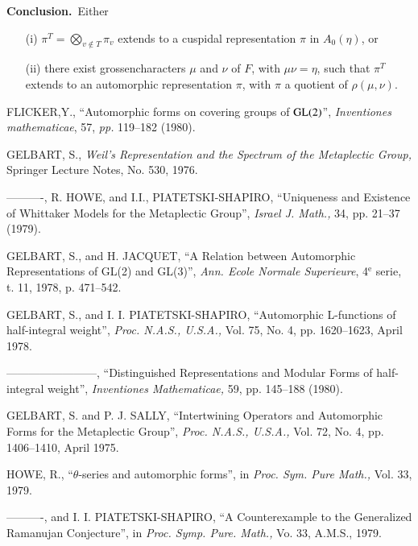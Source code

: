 \medskip
\noindent
{\bf Conclusion.}~Either
\begin{itemize}
\item[(i)] $\pi^{T}=\bigotimes\limits_{v\not\in T}\pi_{v}$ extends to a cuspidal representation $\pi$ in $A_{0}(\eta)$, or

\item[(ii)] there exist grossencharacters $\mu$ and $\nu$ of $F$, with $\mu\nu=\eta$, such that $\pi^{T}$ extends to an automorphic representation $\pi$, with $\pi$ a quotient of $\rho(\mu,\nu)$.
\end{itemize}

\begin{thebibliography}{99}
 FLICKER,\pageoriginale Y., ``Automorphic forms on covering groups of $\mathrm{GL}(2)$'', {\em Inventiones mathematicae}, 57, {\em pp.} 119--182 (1980).

 GELBART, S., {\em Weil's  Representation and the Spectrum of the Metaplectic Group,} Springer Lecture Notes, No. 530, 1976.

----------, R. HOWE, and I.I., PIATETSKI-SHAPIRO, ``Uniqueness and Existence of Whittaker Models for the Metaplectic Group'', {\em Israel J. Math.,} 34, pp. 21--37 (1979). 

 GELBART, S., and H. JACQUET, ``A Relation between Automorphic Representations of GL(2) and GL(3)'', {\em Ann. Ecole Normale Superieure}, 4$^{\text{e}}$ serie, t. 11, 1978, p. 471--542. 

 GELBART, S., and I. I. PIATETSKI-SHAPIRO, ``Automorphic L-functions of half-integral weight'', {\em Proc. N.A.S., U.S.A.,} Vol. 75, No. 4, pp. 1620--1623, April 1978. 

------------------------, ``Distinguished Representations and Modular Forms of half-integral weight'', {\em Inventiones Mathematicae,} 59, pp. 145--188 (1980).  

 GELBART, S. and P. J. SALLY, ``Intertwining Operators and Automorphic Forms for the Metaplectic Group'', {\em Proc. N.A.S., U.S.A.,} Vol. 72, No. 4, pp. 1406--1410, April 1975.  

 HOWE, R., ``$\theta$-series and automorphic forms'', in {\em Proc. Sym. Pure Math.,} Vol. 33, 1979. 

----------, and I. I. PIATETSKI-SHAPIRO, ``A Counterexample to the Generalized Ramanujan Conjecture'', in {\em Proc. Symp. Pure. Math.,} Vo. 33, A.M.S., 1979. 


\end{thebibliography}
